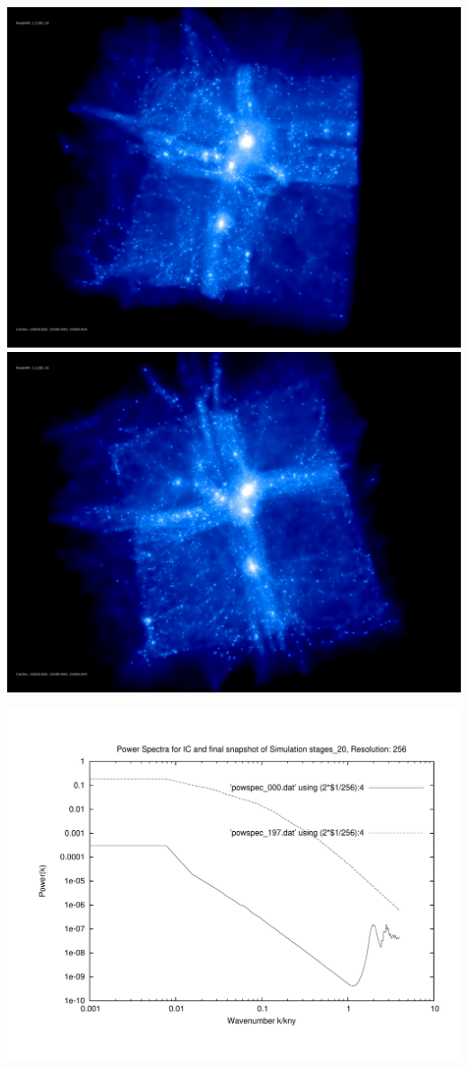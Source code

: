 \includegraphics[scale=0.1]{r256/h100/stages_20/rotate_00074.jpg} 
\includegraphics[scale=0.1]{r256/h100/stages_20/rotate_00131.jpg}

\includegraphics[scale=0.5]{r256/h100/stages_20/plot_powspec_stages_20}

